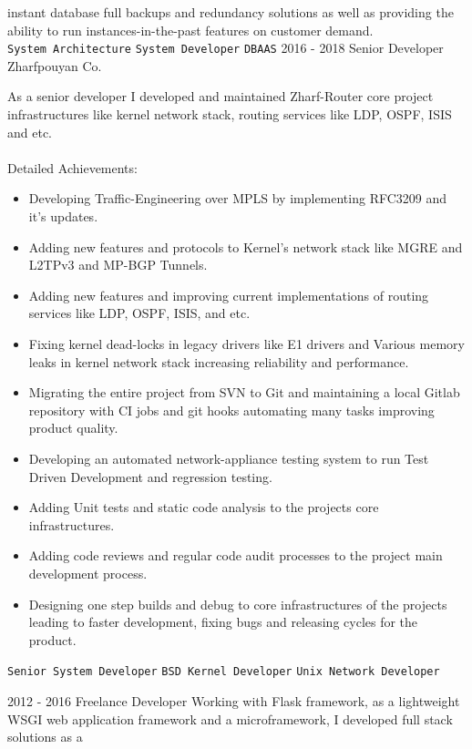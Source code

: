 \documentclass[12pt]{developercv}
\begin{document}
\begin{entrylist}
{		instant database full backups and redundancy solutions as well as
		providing the ability to run instances-in-the-past features on customer
		demand.
		\\
		\texttt{System Architecture}\slashsep
		\texttt{System Developer}\slashsep
		\texttt{DBAAS}\slashsep
		}
	\entry
		{2016 - 2018}
		{Senior Developer}
		{Zharfpouyan Co.}
		{
		As a senior developer I developed and maintained Zharf-Router core project
		infrastructures like kernel network stack, routing services like LDP,
		OSPF, ISIS and etc.
		\\
		\\
		Detailed Achievements:
		\begin{itemize}
			\item Developing Traffic-Engineering over MPLS by implementing RFC3209
				  and it's updates.
			\item Adding new features and protocols to Kernel's network stack like
				  MGRE and L2TPv3 and MP-BGP Tunnels.
			\item Adding new features and improving current implementations of
				  routing services like LDP, OSPF, ISIS, and etc.
			\item Fixing kernel dead-locks in legacy drivers like E1 drivers and
				  Various memory leaks in kernel network stack increasing reliability
				  and performance.
			\item Migrating the entire project from SVN to Git and maintaining a
				  local Gitlab repository with CI jobs and git hooks automating
				  many tasks improving product quality.
			\item Developing an automated network-appliance testing system to run
				  Test Driven Development and regression testing.
			\item Adding Unit tests and static code analysis to the projects core
				  infrastructures.
			\item Adding code reviews and regular code audit processes to the project
				  main development process.
			\item Designing one step builds and debug to core infrastructures of the
				  projects leading to faster development, fixing bugs and releasing
				  cycles for the product. 
		\end{itemize}
		\texttt{Senior System Developer}\slashsep
		\texttt{BSD Kernel Developer}\slashsep
		\texttt{Unix Network Developer}
		}
	\entry
		{2012 - 2016}
		{Freelance Developer}
		{}
		{
		Working with Flask framework, as a lightweight WSGI web application
		framework and a microframework, I developed full stack solutions as a
}
\end{entrylist}
\end{document}

